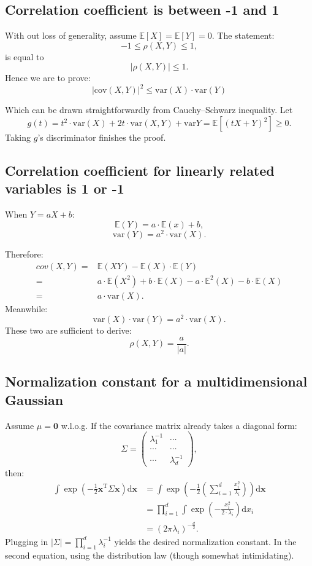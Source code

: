 \documentclass[UTF8]{ctexart}
\begin{document}
\subsection{Correlation coefficient is between -1 and 1}
With out loss of generality, assume $\mathbb{E}[X]=\mathbb{E}[Y]=0$.
The statement:
$$-1 \leq \rho(X,Y) \leq 1,$$
is equal to
$$|\rho(X,Y)| \leq 1.$$
Hence we are to prove:
$$|\text{cov}(X,Y)|^{2} \leq \text{var}(X)\cdot \text{var}(Y)$$

Which can be drawn straightforwardly from Cauchy–Schwarz inequality.
Let
$$g(t)=t^{2}\cdot\text{var}(X)+2t\cdot\text{var}(X,Y)+\text{var}{Y}=\mathbb{E}[(tX+Y)^{2}]\geq 0.$$
Taking $g$'s discriminator finishes the proof.

\subsection{Correlation coefficient for linearly related variables is 1 or -1}
When $Y=aX+b$:
$$\mathbb{E}(Y)=a\cdot\mathbb{E}(x)+b,$$
$$\text{var}(Y)=a^{2}\cdot \text{var}(X).$$

Therefore:
\begin{align}
cov(X,Y)=&\mathbb{E}(XY)-\mathbb{E}(X)\cdot\mathbb{E}(Y)\nonumber \\
=&a\cdot\mathbb{E}(X^{2})+b\cdot\mathbb{E}(X)-a\cdot\mathbb{E}^{2}(X)-b\cdot\mathbb{E}(X)\nonumber \\
=&a\cdot \text{var}(X) \nonumber.
\end{align}
Meanwhile:
$$\text{var}(X)\cdot \text{var}(Y) = a^{2}\cdot \text{var}(X).$$
These two are sufficient to derive:
$$\rho(X,Y) = \frac{a}{|a|}.$$

\subsection{Normalization constant for a multidimensional Gaussian}
Assume $\mu=\textbf{0}$ w.l.o.g.
If the covariance matrix already takes a diagonal form:
$$\Sigma=\begin{pmatrix}
\lambda_{1}^{-1} & \cdots\\
\cdots & \cdots \\
\cdots& \lambda_{d}^{-1}
\end{pmatrix},$$
then:
$$
\begin{aligned}
\int\exp\left(-\frac{1}{2}\textbf{x}^{\text{T}}\Sigma\textbf{x}\right)\text{d}\textbf{x}&=\int\exp\left(-\frac{1}{2}\left(\sum_{i=1}^{d}\frac{x_{i}^{2}}{\lambda_{i}} \right) \right)\text{d}\textbf{x} \\
&=\prod_{i=1}^{d}\int\exp\left(-\frac{x_{i}^{2}}{2\cdot\lambda_{i}} \right)\text{d}x_{i}\\
&=(2\pi\lambda_{i})^{-\frac{d}{2}}.
\end{aligned}
$$
Plugging in $|\Sigma|=\prod_{i=1}^{d}\lambda_{i}^{-1}$ yields the desired normalization constant.
In the second equation, using the distribution law (though somewhat intimidating).
\end{document}
